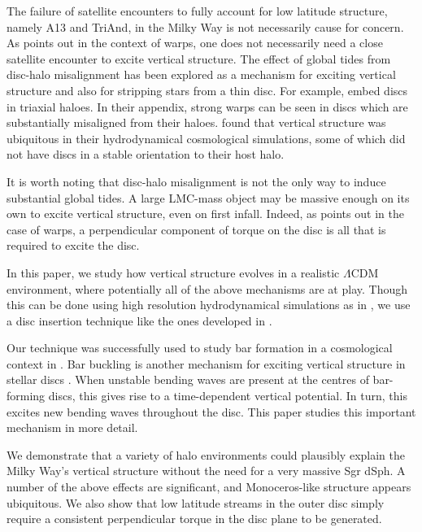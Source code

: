
The failure of satellite encounters to fully account for low latitude structure, namely A13 and TriAnd, in the Milky Way is not necessarily cause for concern. As \citet{binney_1992} points out in the context of warps, one does not necessarily need a close satellite encounter to excite vertical structure. The effect of global tides from disc-halo misalignment has been explored as a mechanism for exciting vertical structure and also for stripping stars from a thin disc. For example, \citet{hu_2016} embed discs in triaxial haloes. In their appendix, strong warps can be seen in discs which are substantially misaligned from their haloes. \citet{gomez_2017} found that vertical structure was ubiquitous in their hydrodynamical cosmological simulations, some of which did not have discs in a stable orientation to their host halo.

It is worth noting that disc-halo misalignment is not the only way to induce substantial global tides. A large LMC-mass object may be massive enough on its own to excite vertical structure, even on first infall. Indeed, as \citet{binney_1992} points out in the case of warps, a perpendicular component of torque on the disc is all that is required to excite the disc.






In this paper, we study how vertical structure evolves in a realistic $\Lambda$CDM environment, where potentially all of the above mechanisms are at play. Though this can be done using high resolution hydrodynamical simulations as in \citet{gomez_2017}, we use a disc insertion technique like the ones developed in \citet{berentzen_2006, debuhr_2012, ys_2015, bauer2018a, hu_2018}.

Our technique was successfully used to study bar formation in a cosmological context in \citet{bauer2018b}. Bar buckling is another mechanism for exciting vertical structure in stellar discs \citep{bar_buckling_echo}. When unstable bending waves are present at the centres of bar-forming discs, this gives rise to a time-dependent vertical potential. In turn, this excites new bending waves throughout the disc. This paper studies this important mechanism in more detail.


We demonstrate that a variety of halo environments could plausibly explain the Milky Way's vertical structure without the need for a very massive Sgr dSph. A number of the above effects are significant, and Monoceros-like structure appears ubiquitous. We also show that low latitude streams in the outer disc simply require a consistent perpendicular torque in the disc plane to be generated.

